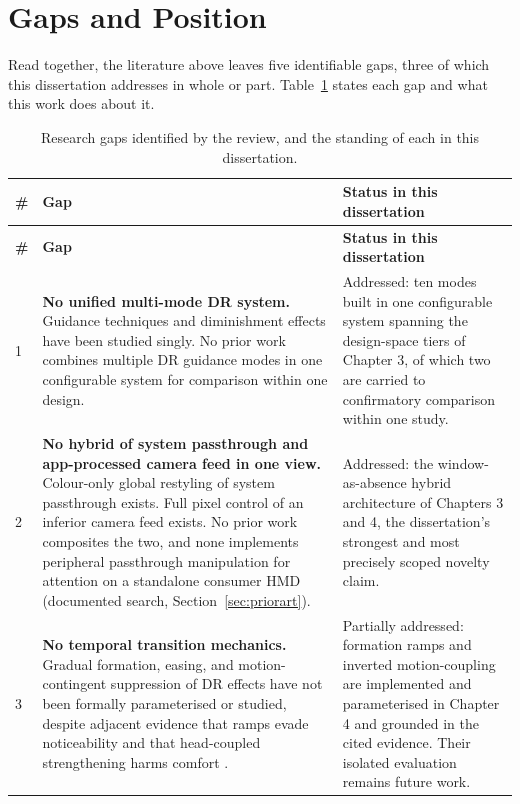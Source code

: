 \section{Gaps and Position}

Read together, the literature above leaves five identifiable gaps, three of which this dissertation
addresses in whole or part. Table~\ref{tab:gaps} states each gap and what this work does about it.

\begin{longtable}{p{}|p{}|p{}}
\caption{Research gaps identified by the review, and the standing of each in this dissertation.}
\label{tab:gaps} \\
\hline
\textbf{\#} & \textbf{Gap} & \textbf{Status in this dissertation} \\
\hline
\endfirsthead
\hline
\textbf{\#} & \textbf{Gap} & \textbf{Status in this dissertation} \\
\hline
\endhead
1 & \textbf{No unified multi-mode DR system.} Guidance techniques and diminishment effects have been studied singly. No prior work combines multiple DR guidance modes in one configurable system for comparison within one design. & Addressed: ten modes built in one configurable system spanning the design-space tiers of Chapter 3, of which two are carried to confirmatory comparison within one study. \\
\hline
2 & \textbf{No hybrid of system passthrough and app-processed camera feed in one view.} Colour-only global restyling of system passthrough exists. Full pixel control of an inferior camera feed exists. No prior work composites the two, and none implements peripheral passthrough manipulation for attention on a standalone consumer HMD (documented search, Section~\ref{sec:priorart}). & Addressed: the window-as-absence hybrid architecture of Chapters 3 and 4, the dissertation's strongest and most precisely scoped novelty claim. \\
\hline
3 & \textbf{No temporal transition mechanics.} Gradual formation, easing, and motion-contingent suppression of DR effects have not been formally parameterised or studied, despite adjacent evidence that ramps evade noticeability \citep{hata2016} and that head-coupled strengthening harms comfort \citep{norouzi2018}. & Partially addressed: formation ramps and inverted motion-coupling are implemented and parameterised in Chapter 4 and grounded in the cited evidence. Their isolated evaluation remains future work. \\
\hline

\end{longtable}
